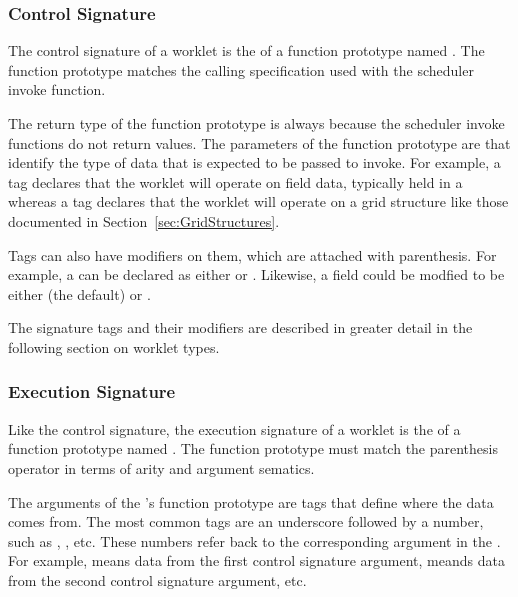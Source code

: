 \subsubsection{Control Signature}
\label{sec:ControlSignature}


The control signature of a worklet is the  of a function
prototype named \controlsignature. The function prototype matches the
calling specification used with the scheduler invoke function.

The return type of the function prototype is always  because
the scheduler invoke functions do not return values. The parameters of the
function prototype are  that identify
the type of data that is expected to be passed to invoke. For example, a
 tag declares that the worklet will operate on field data,
typically held in a  whereas a  tag
declares that the worklet will operate on a grid structure like those
documented in Section~\ref{sec:GridStructures}.

Tags can also have modifiers on them, which are attached with
parenthesis. For example, a  can be declared as either
 or . Likewise, a field
could be modfied to be either  (the default) or
. 

The signature tags and their modifiers are described in greater detail in
the following section on worklet types.


\subsubsection{Execution Signature}
\label{sec:ExecutionSignature}


Like the control signature, the execution signature of a worklet is the
 of a function prototype named \executionsignature. The
function prototype must match the parenthesis operator in terms of arity
and argument sematics.

The arguments of the \executionsignature's function prototype are tags that
define where the data comes from. The most common tags are an underscore
followed by a number, such as , , etc. These
numbers refer back to the corresponding argument in the
\controlsignature. For example,  means data from the first
control signature argument,  meands data from the second
control signature argument, etc.

